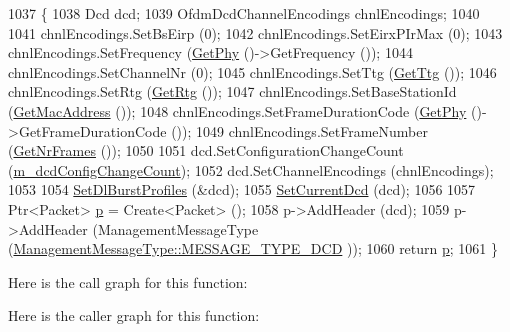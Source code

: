 \begin{DoxyCode}
1037 \{
1038   Dcd dcd;
1039   OfdmDcdChannelEncodings chnlEncodings;
1040 
1041   chnlEncodings.SetBsEirp (0);
1042   chnlEncodings.SetEirxPIrMax (0);
1043   chnlEncodings.SetFrequency (\hyperlink{classns3_1_1WimaxNetDevice_a81c1f9d43acfc9cd5d642b784102a21f}{GetPhy} ()->GetFrequency ());
1044   chnlEncodings.SetChannelNr (0);
1045   chnlEncodings.SetTtg (\hyperlink{classns3_1_1WimaxNetDevice_a229b824a5959b3231ac6edf6d3c01ab6}{GetTtg} ());
1046   chnlEncodings.SetRtg (\hyperlink{classns3_1_1WimaxNetDevice_abd27010a030924757238ad2baef094f0}{GetRtg} ());
1047   chnlEncodings.SetBaseStationId (\hyperlink{classns3_1_1WimaxNetDevice_aa02eb7f6de9c03f0b8f2e33e3c5b5559}{GetMacAddress} ());
1048   chnlEncodings.SetFrameDurationCode (\hyperlink{classns3_1_1WimaxNetDevice_a81c1f9d43acfc9cd5d642b784102a21f}{GetPhy} ()->GetFrameDurationCode ());
1049   chnlEncodings.SetFrameNumber (\hyperlink{classns3_1_1WimaxNetDevice_ad31c0246d640e1d99b1baf3bc5144d36}{GetNrFrames} ());
1050 
1051   dcd.SetConfigurationChangeCount (\hyperlink{classns3_1_1BaseStationNetDevice_abcdaea98567567d67375bea8eb9cfb56}{m\_dcdConfigChangeCount});
1052   dcd.SetChannelEncodings (chnlEncodings);
1053 
1054   \hyperlink{classns3_1_1BaseStationNetDevice_a2110651b30bbf78969c831dacb1b655d}{SetDlBurstProfiles} (&dcd);
1055   \hyperlink{classns3_1_1WimaxNetDevice_ab117daf48e12811b746173822f3869dd}{SetCurrentDcd} (dcd);
1056 
1057   Ptr<Packet> \hyperlink{lte__link__budget_8m_ac9de518908a968428863f829398a4e62}{p} = Create<Packet> ();
1058   p->AddHeader (dcd);
1059   p->AddHeader (ManagementMessageType (\hyperlink{classns3_1_1ManagementMessageType_a0e0c7a1e263538f0379d1bdb015abe3da228291b8cf80e03670c03c53d207e882}{ManagementMessageType::MESSAGE\_TYPE\_DCD}
      ));
1060   \textcolor{keywordflow}{return} \hyperlink{lte__link__budget_8m_ac9de518908a968428863f829398a4e62}{p};
1061 \}
\end{DoxyCode}


Here is the call graph for this function\+:




Here is the caller graph for this function\+:


